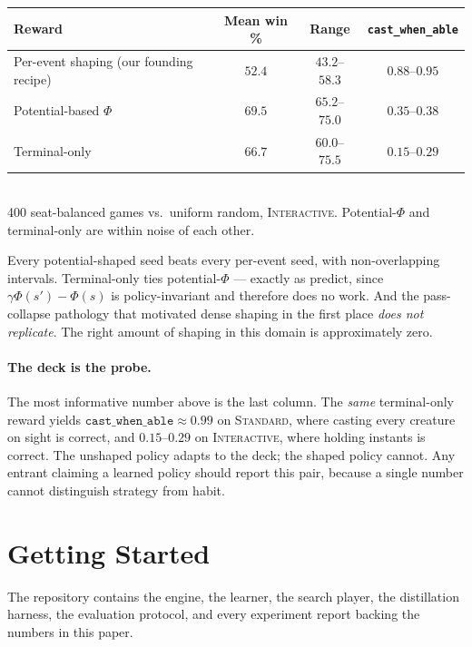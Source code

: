 \documentclass[11pt]{article}
\newcommand{\stddeck}{\textsc{Standard}}
\newcommand{\intdeck}{\textsc{Interactive}}
\begin{document}
\begin{center}\small
\begin{tabular}{lccc}
\toprule
Reward & Mean win \% & Range & \texttt{cast\_when\_able} \\
\midrule
Per-event shaping (our founding recipe) & $52.4$ & $43.2$--$58.3$ & $0.88$--$0.95$ \\
Potential-based $\Phi$ & $\mathbf{69.5}$ & $65.2$--$75.0$ & $0.35$--$0.38$ \\
Terminal-only & $66.7$ & $60.0$--$75.5$ & $0.15$--$0.29$ \\
\bottomrule
\end{tabular}\\[2pt]
{\footnotesize 400 seat-balanced games vs.\ uniform random, \intdeck. Potential-$\Phi$ and terminal-only are within noise of each other.}
\end{center}

Every potential-shaped seed beats every per-event seed, with non-overlapping intervals. Terminal-only ties potential-$\Phi$ --- exactly as \citet{ng1999shaping} predict, since $\gamma\Phi(s')-\Phi(s)$ is policy-invariant and therefore does no work. And the pass-collapse pathology that motivated dense shaping in the first place \emph{does not replicate}. The right amount of shaping in this domain is approximately zero.

\paragraph{The deck is the probe.} The most informative number above is the last column. The \emph{same} terminal-only reward yields $\texttt{cast\_when\_able}\approx0.99$ on \stddeck, where casting every creature on sight is correct, and $0.15$--$0.29$ on \intdeck, where holding instants is correct. The unshaped policy adapts to the deck; the shaped policy cannot. Any entrant claiming a learned policy should report this pair, because a single number cannot distinguish strategy from habit.

\section{Getting Started}

The repository contains the engine, the learner, the search player, the distillation harness, the evaluation protocol, and every experiment report backing the numbers in this paper.
\end{document}
